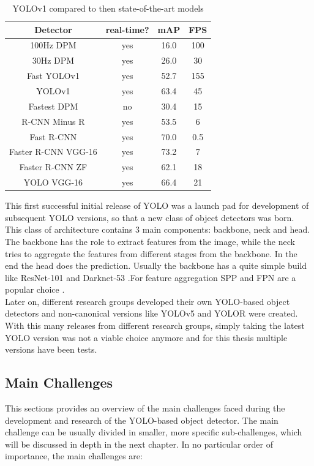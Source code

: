 \begin{table}
  \centering
    \begin{tabular}{ ||c|c|c|c||}
    \hline
    Detector & real-time? & mAP & FPS\\ [0.5ex]
    \hline\hline
    100Hz DPM & yes & 16.0 & 100 \\
    30Hz DPM & yes & 26.0 & 30 \\
    Fast YOLOv1 & yes & 52.7 & 155 \\
    YOLOv1 & yes & 63.4 & 45 \\
    Fastest DPM & no & 30.4 & 15 \\
    R-CNN Minus R & yes & 53.5 & 6 \\
    Fast R-CNN & yes & 70.0 & 0.5 \\
    Faster R-CNN VGG-16 & yes & 73.2 & 7 \\
    Faster R-CNN ZF & yes & 62.1 & 18 \\
    YOLO VGG-16 & yes & 66.4 & 21 \\
    \hline
    \end{tabular}
  \label{intro:yolov1_comp_table}
  \caption{YOLOv1 compared to then state-of-the-art models \cite{yolov1_paper}}
\end{table}

This first successful initial release of YOLO was a launch pad for development of subsequent YOLO versions, so that a new class of object detectors was born. This class of architecture contains 3 main components: backbone, neck and head.
The backbone has the role to extract features from the image, while the neck tries to aggregate the features from different stages from the backbone. In the end the head does the prediction. Usually the backbone has a quite simple build like ResNet-101 and Darknet-53 \cite{yolov3_paper}.For feature aggregation SPP \cite{spp_paper} and FPN \cite{fpn_paper} are a popular choice . \\
Later on, different research groups developed their own YOLO-based object detectors and non-canonical versions like YOLOv5 \cite{yolov5_git} and YOLOR \cite{yolor_paper} were created. With this many releases from different research groups, simply taking the latest YOLO version was not a viable choice anymore and for this thesis multiple versions have been tests.\\

\subsection{Main Challenges} \label{intro:challenges}
This sections provides an overview of the main challenges faced during the development and research of the YOLO-based object detector. The main challenge can be usually divided in smaller, more specific sub-challenges, which will be discussed in depth in the next chapter. In no particular order of importance, the main challenges are:

